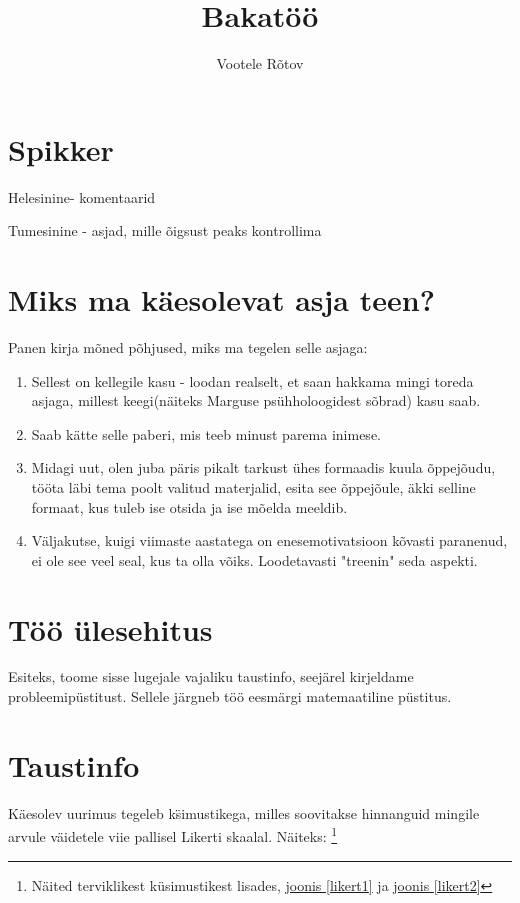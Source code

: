 \documentclass[a4paper]{article}
\author{Vootele Rõtov}
\title{Bakatöö}
\begin{document}
\maketitle

\pagebreak

\tableofcontents

\pagebreak

\section*{Spikker}

{\color{cyan} Helesinine- komentaarid}

{\color{blue} Tumesinine - asjad, mille õigsust peaks kontrollima}


{\color{cyan}\section*{Miks ma käesolevat asja teen?}

Panen kirja mõned põhjused, miks ma tegelen selle asjaga:
\begin{enumerate}[I]
\item Sellest on kellegile kasu - loodan realselt, et saan hakkama mingi toreda asjaga, millest keegi(näiteks Marguse psühholoogidest sõbrad) kasu saab.
\item Saab kätte selle paberi, mis teeb minust parema inimese. 
\item Midagi uut, olen juba päris pikalt tarkust ühes formaadis kuula õppejõudu, tööta läbi tema poolt valitud materjalid, esita see õppejõule, äkki selline formaat, kus tuleb ise otsida ja ise mõelda meeldib.
\item Väljakutse, kuigi viimaste aastatega on enesemotivatsioon kõvasti paranenud, ei ole see veel seal, kus ta olla võiks. Loodetavasti "treenin" seda aspekti.
\end{enumerate}}

\section{Töö \"ulesehitus}
Esiteks, toome sisse lugejale vajaliku taustinfo, seejärel kirjeldame probleemip\"ustitust. Sellele järgneb töö eesmärgi matemaatiline p\"ustitus.

\section{Taustinfo}

Käesolev uurimus tegeleb k\"simustikega, milles soovitakse hinnanguid mingile arvule väidetele viie pallisel Likerti skaalal. Näiteks: \footnote{Näited terviklikest k\"usimustikest lisades, \hyperref[likert1]{joonis \ref*{likert1}} ja \hyperref[likert2]{joonis \ref*{likert2}}}
\end{document}
